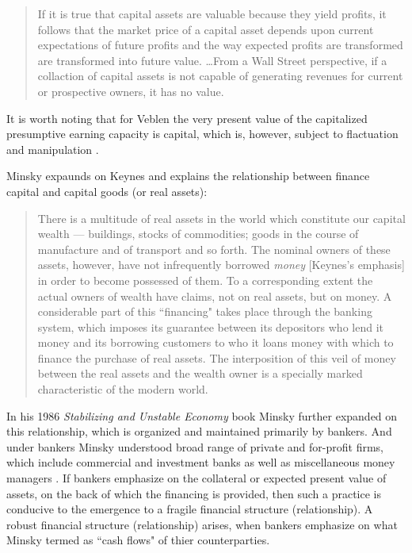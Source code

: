 \begin{quote}
If it is true that capital assets are valuable because they yield profits, it follows that the market price of a capital asset depends upon current expectations of future profits and the way expected profits are transformed are transformed into future value. \dots From a Wall Street perspective, if a collaction of capital assets is not capable of generating revenues for current or prospective owners, it has no value. \citep[pp.~227-228]{minsky1986}
\end{quote}

It is worth noting that for Veblen the very present value of the capitalized presumptive earning capacity is capital, which is, however, subject to flactuation and manipulation \citep[p.~811]{wray2009}.

Minsky expaunds on Keynes and explains the relationship between finance capital and capital goods (or real assets):

\begin{quote}
There is a multitude of real assets in the world which constitute our capital wealth --- buildings, stocks of commodities; goods in the course of manufacture and of transport and so forth. The nominal owners of these assets, however, have not infrequently borrowed \textit{money} [Keynes's emphasis] in order to become possessed of them. To a corresponding extent the actual owners of wealth have claims, not on real assets, but on money. A considerable part of this ``financing" takes place through the banking system, which imposes its guarantee between its depositors who lend it money and its borrowing customers to who it loans money with which to finance the purchase of real assets. The interposition of this veil of money between the real assets and the wealth owner is a specially marked characteristic of the modern world. \citep[p.~115, quoting Keynes ]{minsky1975} 
\end{quote}

In his 1986 \textit{Stabilizing and Unstable Economy} book Minsky further expanded on this relationship, which is organized and maintained primarily by bankers. And under bankers Minsky understood broad range of private and for-profit firms, which include commercial and investment banks as well as miscellaneous money managers \citep[p.~249]{minsky1986}. If bankers emphasize on the collateral or expected present value of assets, on the back of which the financing is provided, then such a practice is conducive to the emergence to a fragile financial structure (relationship). A robust financial structure (relationship) arises, when bankers emphasize on what Minsky termed as ``cash flows" of thier counterparties.       

